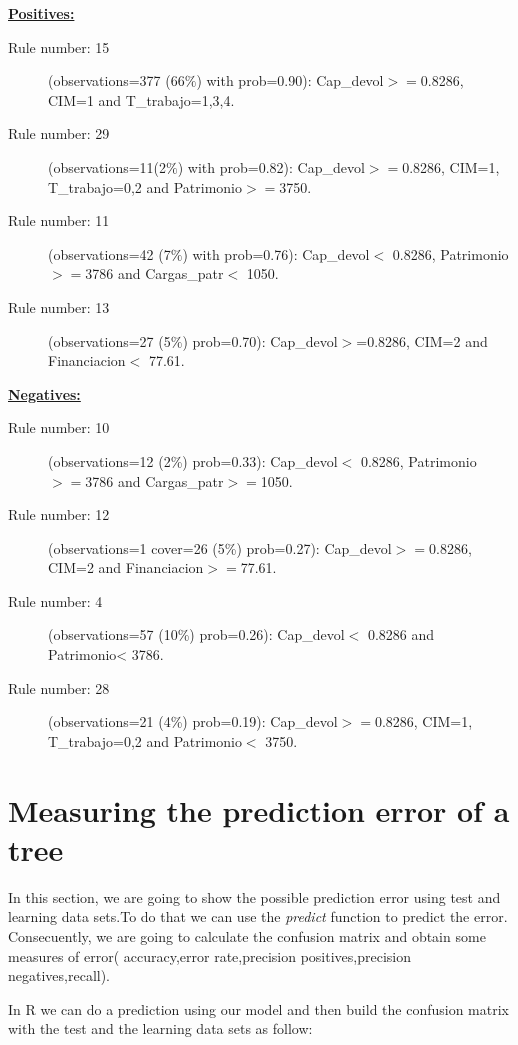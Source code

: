 \documentclass[a4paper, 10pt]{article}
\begin{document}
{\bf\underline{ Positives:}}
\begin{description}
\item [Rule number: 15] (observations=377 (66$\%$) with prob=0.90): Cap\_devol$>=$0.8286, CIM=1 and T\_trabajo={1,3,4}.

\item [Rule number: 29] (observations=11(2$\%$) with prob=0.82): Cap\_devol$>=$0.8286, CIM=1, T\_trabajo={0,2} and Patrimonio$>=$3750.
 
\item [Rule number: 11] (observations=42 (7$\%$) with prob=0.76): Cap\_devol$<$ 0.8286, Patrimonio$>=$3786 and Cargas\_patr$<$ 1050.

\item[ Rule number: 13] (observations=27 (5$\%$) prob=0.70): Cap\_devol$>$=0.8286, CIM=2 and Financiacion$<$ 77.61.
\end{description}

{\bf\underline{ Negatives:}}
\begin{description}
	\item[ Rule number: 10] (observations=12 (2\%) prob=0.33): Cap\_devol$<$ 0.8286, Patrimonio$>=$3786 and Cargas\_patr$>=$1050.
	
	\item [Rule number: 12](observations=1 cover=26 (5\%) prob=0.27): Cap\_devol$>=$0.8286, CIM=2 and Financiacion$>=$77.61.
	
	\item [Rule number: 4] (observations=57 (10\%) prob=0.26): Cap\_devol$<$ 0.8286 and Patrimonio< 3786.
	
	\item[Rule number: 28] (observations=21 (4\%) prob=0.19): Cap\_devol$>=$0.8286, CIM=1, T\_trabajo=0,2 and Patrimonio$<$ 3750.
\end{description}  

\section{Measuring the prediction error of a tree}

In this section, we are going to show the possible prediction error using test and learning data sets.To do that we can use the \textit{predict} function to predict the error. Consecuently, we are going to calculate the confusion matrix and obtain some measures of error( accuracy,error rate,precision positives,precision negatives,recall).

In R we can do a prediction using our model and then build the confusion matrix with the test and the learning data sets as follow:
\end{document}
